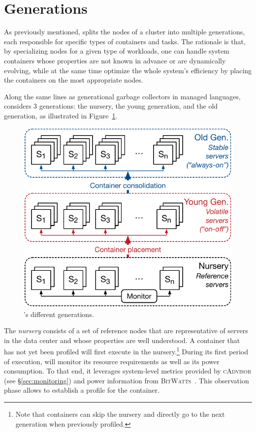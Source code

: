 
\section{Generations}
\label{sec:generations}

As previously mentioned, \GP splits the nodes of a cluster into multiple generations, each responsible for specific types of containers and tasks.
The rationale is that, by specializing nodes for a given type of workloads, one can handle system containers whose properties are not known in advance or are dynamically evolving, while at the same time optimize the whole system's efficiency by placing the containers on the most appropriate nodes.

Along the same lines as generational garbage collectors in managed languages, \GP considers 3 generations: the nursery, the young generation, and the old generation, as illustrated in Figure~\ref{fig:generations}.

\begin{figure}[H]
  \centering
  \includegraphics[width=.75\linewidth]{figures/architecture}
  \caption{\GP's different generations.}
  \label{fig:generations}
\end{figure}


The \emph{nursery} consists of a set of reference nodes that are representative of servers in the data center and whose properties are well understood.
A container that has not yet been profiled will first execute in the nursery.\footnote{Note that containers can skip the nursery and directly go to the next generation when previously profiled.}
During its first period of execution, \GP will monitor its resource requirements as well as its power consumption.
To that end, it leverages system-level metrics provided by \textsc{cAdvisor} (see \S\ref{sec:monitoring}) and power information from \textsc{BitWatts}~\cite{DBLP:conf/eurosys/ColmantKFHRS15}.
This observation phase allows \GP to establish a profile for the container.


